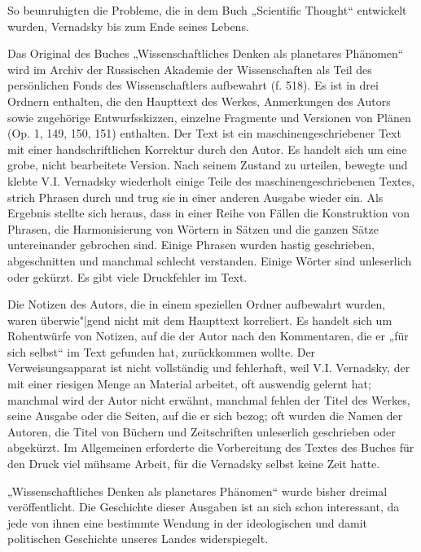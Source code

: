 \documentclass[11pt,a4paper]{article}
\begin{document}
So beunruhigten die Probleme, die in dem Buch „Scientific Thought“ entwickelt
wurden, Vernadsky bis zum Ende seines Lebens.

Das Original des Buches „Wissenschaftliches Denken als planetares Phänomen“
wird im Archiv der Russischen Akademie der Wissenschaften als Teil des
persönlichen Fonds des Wissenschaftlers aufbewahrt (f. 518). Es ist in drei
Ordnern enthalten, die den Haupttext des Werkes, Anmerkungen des Autors sowie
zugehörige Entwurfsskizzen, einzelne Fragmente und Versionen von Plänen
(Op. 1, 149, 150, 151) enthalten. Der Text ist ein maschinengeschriebener Text
mit einer handschriftlichen Korrektur durch den Autor. Es handelt sich um eine
grobe, nicht bearbeitete Version. Nach seinem Zustand zu urteilen, bewegte und
klebte V.I. Vernadsky wiederholt einige Teile des maschinengeschriebenen
Textes, strich Phrasen durch und trug sie in einer anderen Ausgabe wieder ein.
Als Ergebnis stellte sich heraus, dass in einer Reihe von Fällen die
Konstruktion von Phrasen, die Harmonisierung von Wörtern in Sätzen und die
ganzen Sätze untereinander gebrochen sind. Einige Phrasen wurden hastig
geschrieben, abgeschnitten und manchmal schlecht verstanden. Einige Wörter
sind unleserlich oder gekürzt. Es gibt viele Druckfehler im Text.

Die Notizen des Autors, die in einem speziellen Ordner aufbewahrt wurden,
waren überwie"|gend nicht mit dem Haupttext korreliert. Es handelt sich um
Rohentwürfe von Notizen, auf die der Autor nach den Kommentaren, die er „für
sich selbst“ im Text gefunden hat, zurückkommen wollte. Der Verweisungsapparat
ist nicht vollständig und fehlerhaft, weil V.I. Vernadsky, der mit einer
riesigen Menge an Material arbeitet, oft auswendig gelernt hat; manchmal wird
der Autor nicht erwähnt, manchmal fehlen der Titel des Werkes, seine Ausgabe
oder die Seiten, auf die er sich bezog; oft wurden die Namen der Autoren, die
Titel von Büchern und Zeitschriften unleserlich geschrieben oder abgekürzt. Im
Allgemeinen erforderte die Vorbereitung des Textes des Buches für den Druck
viel mühsame Arbeit, für die Vernadsky selbst keine Zeit hatte.

„Wissenschaftliches Denken als planetares Phänomen“ wurde bisher dreimal
veröffentlicht. Die Geschichte dieser Ausgaben ist an sich schon interessant,
da jede von ihnen eine bestimmte Wendung in der ideologischen und damit
politischen Geschichte unseres Landes widerspiegelt.
\end{document}
